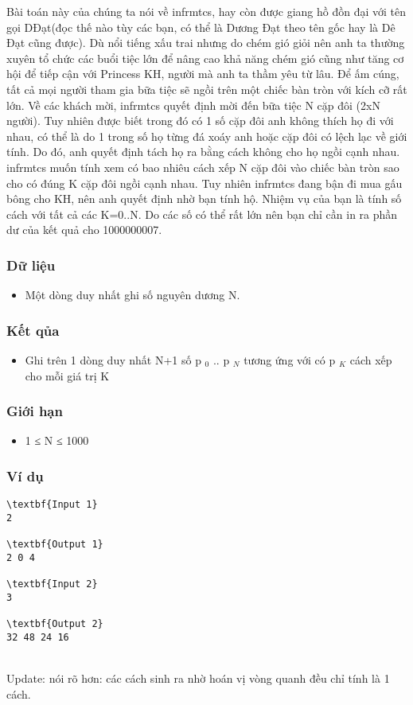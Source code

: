 

Bài toán này của chúng ta nói về infrmtcs, hay còn được giang hồ đồn đại với tên gọi DĐạt(đọc thế nào tùy các bạn, có thể là Dương Đạt theo tên gốc hay là Dê Đạt cũng được). Dù nổi tiếng xấu trai nhưng do chém gió giỏi nên anh ta thường xuyên tổ chức các buổi tiệc lớn để nâng cao khả năng chém gió cũng như tăng cơ hội để tiếp cận với Princess KH, người mà anh ta thầm yêu từ lâu. Để ấm cúng, tất cả mọi người tham gia bữa tiệc sẽ ngồi trên một chiếc bàn tròn với kích cỡ rất lớn. Về các khách mời, infrmtcs quyết định mời đến bữa tiệc N cặp đôi (2xN người). Tuy nhiên được biết trong đó có 1 số cặp đôi anh không thích họ đi với nhau, có thể là do 1 trong số họ từng đá xoáy anh hoặc cặp đôi có lệch lạc về giới tính. Do đó, anh quyết định tách họ ra bằng cách không cho họ ngồi cạnh nhau. infrmtcs muốn tính xem có bao nhiêu cách xếp N cặp đôi vào chiếc bàn tròn sao cho có đúng K cặp đôi ngồi cạnh nhau. Tuy nhiên infrmtcs đang bận đi mua gấu bông cho KH, nên anh quyết định nhờ bạn tính hộ. Nhiệm vụ của bạn là tính số cách với tất cả các K=0..N. Do các số có thể rất lớn nên bạn chỉ cần in ra phần dư của kết quả cho 1000000007.

\subsubsection{Dữ liệu}
\begin{itemize}
	\item Một dòng duy nhất ghi số nguyên dương N.
\end{itemize}

\subsubsection{Kết qủa}
\begin{itemize}
	\item Ghi trên 1 dòng duy nhất N+1 số p $_ 0 $ .. p $_ N $ tương ứng với có p $_ K $ cách xếp cho mỗi giá trị K
\end{itemize}

\subsubsection{Giới hạn}
\begin{itemize}
	\item 1 ≤ N ≤ 1000
\end{itemize}

\subsubsection{Ví dụ}
\begin{verbatim}
\textbf{Input 1}
2

\textbf{Output 1}
2 0 4

\textbf{Input 2}
3

\textbf{Output 2}
32 48 24 16 \end{verbatim}


\\Update: nói rõ hơn: các cách sinh ra nhờ hoán vị vòng quanh đều chỉ tính là 1 cách.